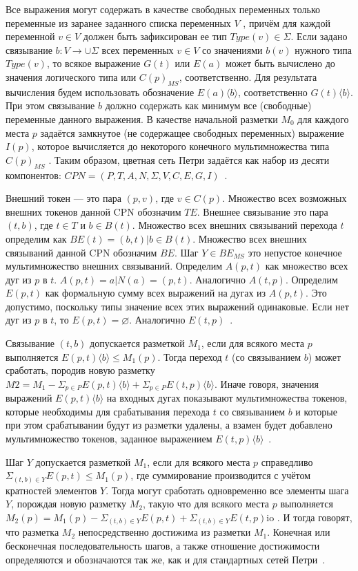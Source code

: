 Все выражения могут содержать в качестве свободных переменных только переменные из заранее заданного списка переменных $V$ , причём для каждой переменной $v \in V$ должен быть зафиксирован ее тип $Type(v) \in \Sigma$. Если задано связывание $b : V  \rightarrow \cup \Sigma$ всех переменных $v \in V$ со значениями $b(v)$ нужного типа $Type(v)$, то всякое выражение $G(t)$ или $E(a)$ может быть вычислено до значения логического типа или $C(p)_{MS}$, соответственно. Для результата вычисления будем использовать обозначение $E(a) \langle b \rangle$, соответственно $G(t) \langle b \rangle$. При этом связывание $b$ должно содержать как минимум все (свободные) переменные данного выражения. В качестве начальной разметки $M_0$ для каждого места $p$ задаётся замкнутое (не содержащее свободных переменных) выражение $I(p)$, которое вычисляется до некоторого конечного мультимножества типа $C(p)_{MS}$ . Таким образом, цветная сеть Петри задаётся как набор из десяти компонентов: $CPN = (P, T, A, N, \Sigma, V, C, E, G, I)$~\cite{cpn}.

Внешний токен --- это пара $(p, v)$, где $v \in C(p)$. Множество всех возможных внешних токенов данной CPN обозначим $TE$. Внешнее связывание это пара $(t, b)$, где $t \in T$ и $b \in B(t)$. Множество всех внешних связываний перехода $t$ определим как $BE(t) = {(b, t)|b \in B(t)}$. Множество всех внешних связываний данной CPN обозначим $BE$. Шаг $Y \in BE_{MS}$ это непустое конечное мультимножество внешних
связываний. Определим $A(p, t)$ как множество всех дуг из $p$ в $t$. $A(p, t) = {a|N(a) = (p, t)}$. Аналогично $A(t, p)$. Определим $E(p, t)$ как формальную сумму всех выражений на дугах из $A(p, t)$. Это допустимо, поскольку типы значение всех этих выражений одинаковые. Если нет дуг из $p$ в $t$, то $E(p, t) = \varnothing$. Аналогично $E(t, p)$~\cite{cpn}.

Связывание $(t, b)$ допускается разметкой $M_1$, если для всякого места $p$ выполняется $E(p, t) \langle b \rangle  \leq M_1(p)$. Тогда переход $t$ (со связыванием $b$) может сработать, породив новую разметку $M2 = M_1 - \Sigma_ {p \in P} E(p, t) \langle b \rangle + \Sigma_{p \in P} E(t, p)\langle b \rangle$. Иначе говоря, значения выражений $E(p, t) \langle b \rangle$ на входных дугах показывают мультимножества токенов, которые необходимы для срабатывания перехода $t$ со связыванием $b$ и которые при этом срабатывании будут из разметки удалены, а взамен будет добавлено мультимножество токенов, заданное выражением $E(t, p) \langle b \rangle$~\cite{cpn}.

Шаг $Y$ допускается разметкой $M_1$, если для всякого места $p$ справедливо $\Sigma_{(t,b) \in Y} E(p, t) \leq M_1(p)$, где суммирование производится с учётом кратностей элементов $Y$. Тогда могут сработать одновременно все элементы шага $Y$, порождая новую разметку $M_2$, такую что для всякого места $p$ выполняется $M_2(p) = M_1(p) - \Sigma_{(t,b) \in Y} E(p, t) + \Sigma_{(t,b) \in Y} E(t, p)$io
. И тогда говорят, что разметка $M_2$ непосредственно достижима из разметки $M_1$. Конечная или бесконечная последовательность шагов, а также отношение достижимости определяются и обозначаются так же, как и для стандартных сетей Петри~\cite{cpn}.

